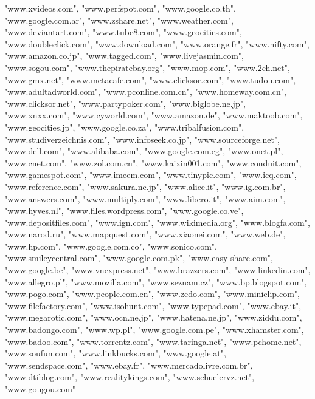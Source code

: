 	"www.xvideos.com",
	"www.perfspot.com",
	"www.google.co.th",
	"www.google.com.ar",
	"www.zshare.net",
	"www.weather.com",
	"www.deviantart.com",
	"www.tube8.com",
	"www.geocities.com",
	"www.doubleclick.com",
	"www.download.com",
	"www.orange.fr",
	"www.nifty.com",
	"www.amazon.co.jp",
	"www.tagged.com",
	"www.livejasmin.com",
	"www.sogou.com",
	"www.thepiratebay.org",
	"www.mop.com",
	"www.2ch.net",
	"www.gmx.net",
	"www.metacafe.com",
	"www.clicksor.com",
	"www.tudou.com",
	"www.adultadworld.com",
	"www.pconline.com.cn",
	"www.homeway.com.cn",
	"www.clicksor.net",
	"www.partypoker.com",
	"www.biglobe.ne.jp",
	"www.xnxx.com",
	"www.cyworld.com",
	"www.amazon.de",
	"www.maktoob.com",
	"www.geocities.jp",
	"www.google.co.za",
	"www.tribalfusion.com",
	"www.studiverzeichnis.com",
	"www.infoseek.co.jp",
	"www.sourceforge.net",
	"www.dell.com",
	"www.alibaba.com",
	"www.google.com.eg",
	"www.onet.pl",
	"www.cnet.com",
	"www.zol.com.cn",
	"www.kaixin001.com",
	"www.conduit.com",
	"www.gamespot.com",
	"www.imeem.com",
	"www.tinypic.com",
	"www.icq.com",
	"www.reference.com",
	"www.sakura.ne.jp",
	"www.alice.it",
	"www.ig.com.br",
	"www.answers.com",
	"www.multiply.com",
	"www.libero.it",
	"www.aim.com",
	"www.hyves.nl",
	"www.files.wordpress.com",
	"www.google.co.ve",
	"www.depositfiles.com",
	"www.ign.com",
	"www.wikimedia.org",
	"www.blogfa.com",
	"www.narod.ru",
	"www.mapquest.com",
	"www.xiaonei.com",
	"www.web.de",
	"www.hp.com",
	"www.google.com.co",
	"www.sonico.com",
	"www.smileycentral.com",
	"www.google.com.pk",
	"www.easy-share.com",
	"www.google.be",
	"www.vnexpress.net",
	"www.brazzers.com",
	"www.linkedin.com",
	"www.allegro.pl",
	"www.mozilla.com",
	"www.seznam.cz",
	"www.bp.blogspot.com",
	"www.pogo.com",
	"www.people.com.cn",
	"www.zedo.com",
	"www.miniclip.com",
	"www.filefactory.com",
	"www.isohunt.com",
	"www.typepad.com",
	"www.ebay.it",
	"www.megarotic.com",
	"www.ocn.ne.jp",
	"www.hatena.ne.jp",
	"www.ziddu.com",
	"www.badongo.com",
	"www.wp.pl",
	"www.google.com.pe",
	"www.xhamster.com",
	"www.badoo.com",
	"www.torrentz.com",
	"www.taringa.net",
	"www.pchome.net",
	"www.soufun.com",
	"www.linkbucks.com",
	"www.google.at",
	"www.sendspace.com",
	"www.ebay.fr",
	"www.mercadolivre.com.br",
	"www.dtiblog.com",
	"www.realitykings.com",
	"www.schuelervz.net",
	"www.gougou.com"
